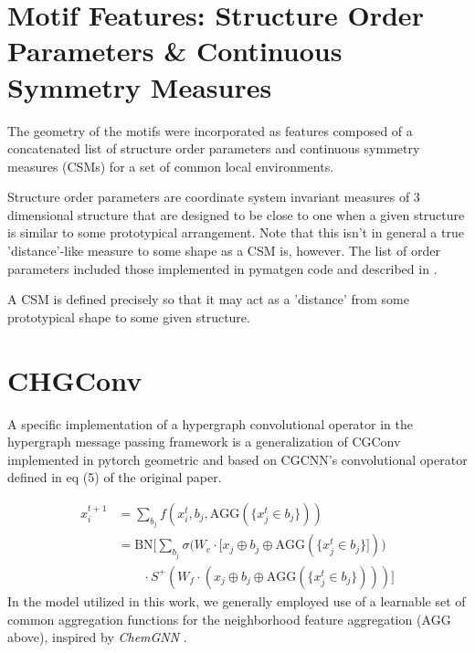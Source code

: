 \documentclass[10pt,a4paper,twocolumn]{article}
\begin{document}




\section{Motif Features: Structure Order Parameters \& Continuous Symmetry Measures}
The geometry of the motifs were incorporated as features composed of a concatenated list of structure order parameters and continuous symmetry measures (CSMs) for a set of common local environments. 

Structure order parameters are coordinate system invariant measures of 3 dimensional structure that are designed to be close to one when a given structure is similar to some prototypical arrangement. Note that this isn't in general a true 'distance'-like measure to some shape as a CSM is, however. The list of order parameters included those implemented in pymatgen code and described in \cite{orderparam1, orderparam2}.

A CSM is defined precisely so that it may act as a 'distance' from some prototypical shape to some given structure.

\section{CHGConv}\label{chgconv}
A specific implementation of a hypergraph convolutional operator in the hypergraph message passing framework is a generalization of CGConv implemented in pytorch geometric and based on CGCNN's convolutional operator defined in eq (5) of the original paper.

\begin{align*}
x_i^{t+1} &= \sum_{b_j} f(x_i^t, b_j,\text{AGG}(\lbrace x_j^t\in b_j \rbrace )) \\ 
& = \text{BN}\bigg[\sum_{b_j}\sigma \big(W_c\cdot [x_j\oplus b_j\oplus \text{AGG}(\lbrace x_j^t\in b_j \rbrace ] )\big)\\
&\quad\quad\cdot S^+ (W_f\cdot (x_j\oplus b_j\oplus \text{AGG}(\lbrace x_j^t\in b_j \rbrace ) )  ) \bigg]
\end{align*}
In the model utilized in this work, we generally employed use of a learnable set of common aggregation functions for the neighborhood feature aggregation ($\text{AGG}$ above), inspired by \textit{ChemGNN} \cite{chemgnn}.
\end{document}
